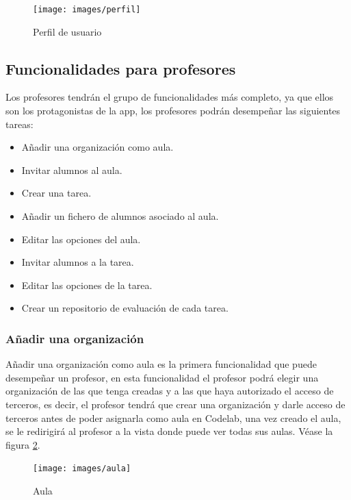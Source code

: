 \begin{figure}[!th]
\begin{center}
\texttt{[image: images/perfil]}
\caption{Perfil de usuario}
\label{fig:Perfil de usuario}
\end{center}
\end{figure}

\newpage

\subsection{Funcionalidades para profesores}
\label{3:6:2}

Los profesores tendrán el grupo de funcionalidades más completo, ya que ellos son los protagonistas de la app, los profesores podrán desempeñar las siguientes tareas:

\begin{itemize}
  \item Añadir una organización como aula.
  \item Invitar alumnos al aula.
  \item Crear una tarea.
  \item Añadir un fichero de alumnos asociado al aula.
  \item Editar las opciones del aula.
  \item Invitar alumnos a la tarea.
  \item Editar las opciones de la tarea.
  \item Crear un repositorio de evaluación de cada tarea.
\end{itemize}

\subsubsection{Añadir una organización}

Añadir una organización como aula es la primera funcionalidad que puede desempeñar un profesor, en esta funcionalidad el profesor podrá elegir una organización de las que tenga creadas y a las que haya autorizado el acceso de terceros, 
es decir, el profesor tendrá que crear una organización y darle acceso de terceros antes de poder asignarla como aula en Codelab, una vez creado el aula, se le redirigirá al profesor a la vista donde puede ver todas sus aulas.
Véase la figura \ref{fig:Aula}.

\begin{figure}[!th]
\begin{center}
\texttt{[image: images/aula]}
\caption{Aula}
\label{fig:Aula}
\end{center}
\end{figure}

